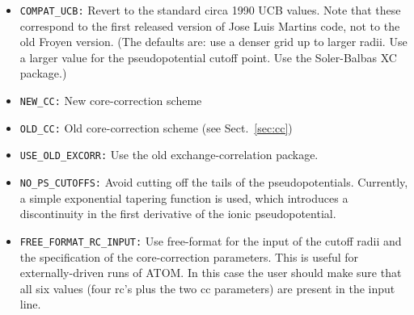 \documentclass[11pt]{article}
\begin{document}
\begin{itemize}
\item {\tt COMPAT\_UCB:}  Revert to the standard circa 1990 UCB values. Note   
                   that these correspond to the first released version 
                   of Jose Luis Martins code, not to the old Froyen        
                   version.
     (The defaults are: use a denser grid up to larger radii.
              Use a larger value for the pseudopotential
cutoff point.  Use the Soler-Balbas XC package.)  
                                                                          
\item  {\tt NEW\_CC:} New core-correction scheme
\item {\tt OLD\_CC:}  Old core-correction scheme  (see Sect.~\ref{sec:cc})
 
\item {\tt USE\_OLD\_EXCORR:} Use the old exchange-correlation package.

\item {\tt NO\_PS\_CUTOFFS:} Avoid cutting off the tails of the
pseudopotentials. Currently, a simple exponential tapering function is
used, which introduces a discontinuity in the first derivative of the
ionic pseudopotential.

\item {\tt FREE\_FORMAT\_RC\_INPUT:} Use free-format for the input of
the cutoff radii and the specification of the core-correction
parameters. This is useful for externally-driven runs of ATOM. In this
case the user should make sure that all six values (four rc's plus
the two cc parameters) are present in the input line.

\end{itemize}


\end{document}
